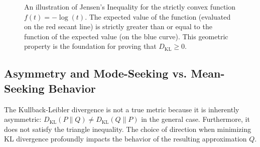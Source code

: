 \begin{figure}[htbp]
\centering
{}
\caption{An illustration of Jensen's Inequality for the strictly convex function $f(t) = -\log(t)$. The expected value of the function (evaluated on the red secant line) is strictly greater than or equal to the function of the expected value (on the blue curve). This geometric property is the foundation for proving that $D_{\text{KL}} \ge 0$.}
\label{fig:jensens}
\end{figure}

\subsection{Asymmetry and Mode-Seeking vs. Mean-Seeking Behavior}

The Kullback-Leibler divergence is not a true metric because it is inherently asymmetric: $D_{\text{KL}}(P \parallel Q) \ne D_{\text{KL}}(Q \parallel P)$ in the general case. Furthermore, it does not satisfy the triangle inequality. The choice of direction when minimizing KL divergence profoundly impacts the behavior of the resulting approximation $Q$.

